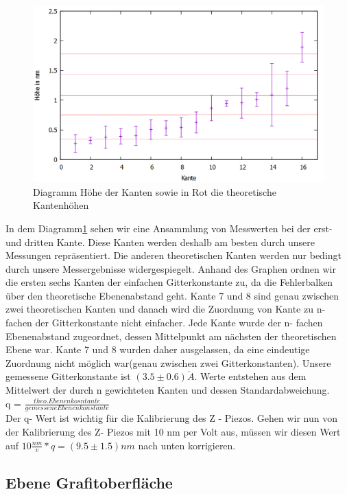 \documentclass[10pt,a4paper]{article}
\begin{document}
\begin{figure}[]
	\includegraphics[scale = 0.5]{kantendiag.png}
	\centering
	\caption{Diagramm Höhe der Kanten sowie in Rot die theoretische Kantenhöhen}
	\label{kantendia}
\end{figure}

In dem Diagramm\ref{kantendia} sehen wir eine Ansammlung von Messwerten bei der erst- und dritten Kante. Diese Kanten werden deshalb am besten durch unsere Messungen repräsentiert. Die anderen theoretischen Kanten werden nur bedingt durch unsere Messergebnisse widergespiegelt.
Anhand des Graphen ordnen wir die ersten sechs Kanten der einfachen Gitterkonstante zu, da die Fehlerbalken über den theoretische Ebenenabstand geht. Kante 7 und 8 sind genau zwischen zwei theoretischen Kanten und danach wird die Zuordnung von Kante zu n-fachen der Gitterkonstante nicht einfacher.
Jede Kante wurde der n- fachen Ebenenabstand zugeordnet, dessen Mittelpunkt am nächsten der theoretischen Ebene war. Kante 7 und 8 wurden daher ausgelassen, da eine eindeutige Zuordnung nicht möglich war(genau zwischen zwei Gitterkonstanten). Unsere gemessene Gitterkonstante ist $(3.5 \pm 0.6) \mathring{A}$. Werte entstehen aus dem Mittelwert der durch n gewichteten Kanten und dessen Standardabweichung. \\ 
q =  $\frac {theo. Ebenenkosntante} {gemessene Ebenenkonstante}$\\
Der q- Wert ist wichtig für die Kalibrierung des Z - Piezos.
Gehen wir nun von der Kalibrierung des Z- Piezos mit 10 nm per Volt aus, müssen wir diesen Wert auf $10 \frac {nm} {v} * q = (9.5 \pm1.5)nm$ nach unten korrigieren.


\subsection{Ebene Grafitoberfläche}
\end{document}
